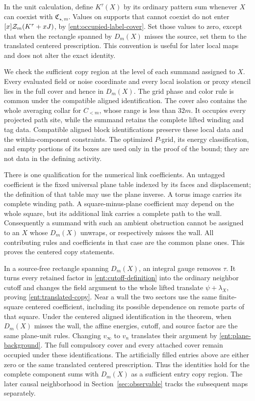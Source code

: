 In the unit calculation, define \(K^\tau(X)\) by its ordinary
pattern sum whenever \(X\) can coexist with
\(\mathfrak C_{\star,m}\).  Values on supports that cannot
coexist do not enter \([x]\mathcal Z_m(K^\tau+xJ)\), by
\eqref{ent:occupied-label-cover}.  Set those values to zero,
except that when the rectangle spanned by \(D_m(X)\) misses the
source, set them to the translated centered prescription.
This convention is useful for later local maps and does not
alter the exact identity.

We check the sufficient copy region at the level of each summand
assigned to \(X\).  Every evaluated field or noise coordinate and
every local isolation or proxy stencil lies in the full cover and
hence in \(D_m(X)\).  The grid phase and color rule is common under
the compatible aligned identification.  The cover also contains the
whole averaging collar for \(C_{<m}\), whose range is less than
\(32m\).  It occupies every projected path site, while the summand
retains the complete lifted winding and tag data.  Compatible aligned block
identifications preserve these local data and the within-component
constraints.  The optimized \(P\)-grid, its energy classification,
and empty portions of its boxes are used only in the proof of the
bound; they are not data in the defining activity.

There is one qualification for the numerical link coefficients.
An untagged coefficient is the fixed universal plane table indexed
by its faces and displacement; the definition of that table may use
the plane inverse.  A torus image carries its complete winding path.
A square-minus-plane coefficient may depend on the whole square,
but its additional link carries a complete path to the wall.
Consequently a summand with such an ambient obstruction cannot be
assigned to an \(X\) whose \(D_m(X)\) unwraps, or respectively misses
the wall.  All contributing rules and coefficients in that case are
the common plane ones.  This proves the centered copy statements.

In a source-free rectangle spanning \(D_m(X)\), an integral gauge
removes \(\tau\).  It turns every retained factor in
\eqref{ent:cutoff-definition} into the ordinary neighbor cutoff and
changes the field argument to the whole lifted translate
\(\psi+\lambda_X\), proving \eqref{ent:translated-copy}.  Near a wall
the two sectors use the same finite-square centered coefficient,
including its possible dependence on remote parts of that square.
Under the centered aligned identification in the theorem, when
\(D_m(X)\) misses the wall, the affine energies, cutoff, and source
factor are the same plane-unit rules.  Changing
\(v_\infty\) to \(v_n\) translates their argument by
\eqref{ent:plane-background}.  The full compulsory cover and every
attached cover remain occupied under these identifications.  The
artificially filled entries above are either zero or the same
translated centered prescription.  Thus the identities hold for
the complete component sums with \(D_m(X)\) as a sufficient entry
copy region.  The later causal neighborhood in
Section~\ref{sec:observable} tracks the subsequent maps separately.

